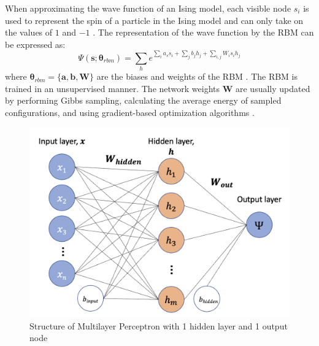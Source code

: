 When approximating the wave function of an Ising model, each visible node $s_i$ is used to represent the spin of a particle in the Ising model and can only take on the values of $1$ and $-1$ \cite{b20}. The representation of the wave function by the RBM can be expressed as:
\begin{equation}
    \Psi(\boldsymbol{s} ; \boldsymbol{\theta}_{rbm}) = \sum_{h} e^{\sum_i a_s s_i + \sum_j b_j h_j + \sum_{i,j}W_i s_i h_j} 
\end{equation}
where  $\boldsymbol{\theta}_{rbm} = \{\boldsymbol{a}, \boldsymbol{b}, \boldsymbol{W}\}$ are the biases and weights of the RBM \cite{b20}. The RBM is trained in an unsupervised manner. The network weights $\mathbf{W}$ are usually updated by performing Gibbs sampling, calculating the average energy of sampled configurations, and using gradient-based optimization algorithms \cite{b25}.

\begin{figure}[h!]
    \centering
    \includegraphics[width=0.7\linewidth]{images/mlp_diagram.png}
    \caption{Structure of Multilayer Perceptron with 1 hidden layer and 1 output node}
    \label{rbmstructure}
\end{figure}

